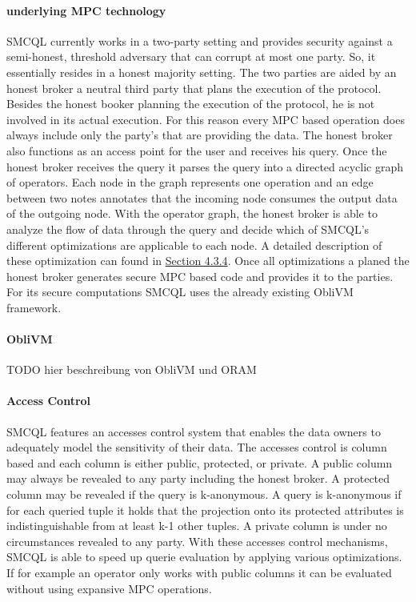 \paragraph{underlying MPC technology}
SMCQL currently works in a two-party setting and provides security against a semi-honest, threshold adversary that can corrupt at most one party.  So, it essentially resides in a honest majority setting. The two parties are aided by an honest broker a neutral third party that plans the execution of the protocol. Besides the honest booker planning the execution of the protocol, he is not involved in its actual execution. For this reason every MPC based operation does always include only the party's that are providing the data.
The honest broker also functions as an access point for the user and receives his query. 
Once the honest broker receives the query it parses the query into a directed acyclic graph of operators. Each node in the graph represents one operation and an edge between two notes annotates that the incoming node consumes the output data of the outgoing node. With the operator graph, the honest broker is able to analyze the flow of data through the query and decide which of SMCQL's different optimizations are applicable to each node. 
A detailed description of these optimization can found in \hyperref[sec:Optimizations_smcql]{Section 4.3.4}. Once all optimizations a planed the honest broker generates secure MPC based code and provides it to the parties. For its secure computations SMCQL uses the already existing ObliVM framework.
\paragraph{ObliVM}
TODO hier beschreibung von ObliVM und ORAM 
\label{Accesses_label}	
\paragraph{Access Control}
SMCQL features an accesses control system that enables the data owners to adequately model the sensitivity of their data. 
The accesses control is column based and each column is either public, protected, or private. 
A public column may always be revealed to any party including the honest broker. A protected column may be revealed if the query is k-anonymous. A query is k-anonymous if for each queried tuple it holds that the projection onto its protected attributes is indistinguishable from at least k-1 other tuples. A private column is under no circumstances revealed to any party. With these accesses control mechanisms, SMCQL is able to speed up querie evaluation by applying various optimizations. If for example an operator only works with public columns it can be evaluated without using expansive MPC operations.


